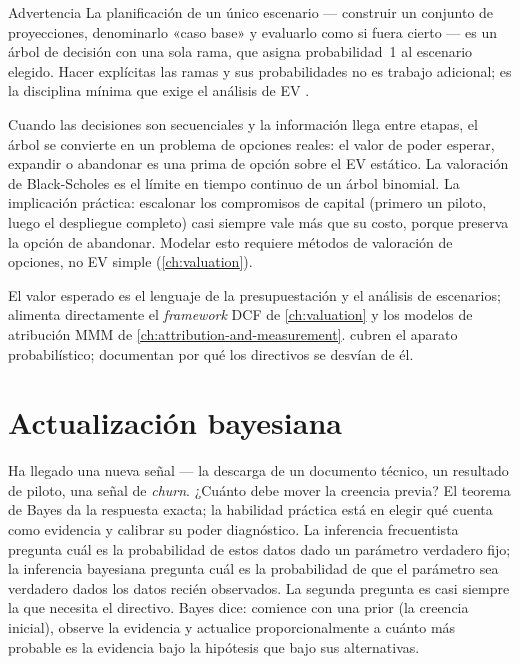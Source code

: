 \begin{admonition}{Advertencia}
La planificación de un único escenario --- construir un conjunto de proyecciones, denominarlo
«caso base» y evaluarlo como si fuera cierto --- es un árbol de decisión con una sola rama, que
asigna probabilidad~1 al escenario elegido. Hacer explícitas las ramas y sus probabilidades no es
trabajo adicional; es la disciplina mínima que exige el análisis de EV \parencite{kahneman2011}.
\end{admonition}

Cuando las decisiones son secuenciales y la información llega entre etapas, el árbol se convierte en
un problema de opciones reales: el valor de poder esperar, expandir o abandonar es una prima de opción
sobre el EV estático. La valoración de Black-Scholes es el límite en tiempo continuo de un árbol
binomial. La implicación práctica: escalonar los compromisos de capital (primero un piloto, luego el
despliegue completo) casi siempre vale más que su costo, porque preserva la opción de abandonar.
Modelar esto requiere métodos de valoración de opciones, no EV simple (\cref{ch:valuation}).

El valor esperado es el lenguaje de la presupuestación y el análisis de escenarios; alimenta directamente
el \emph{framework} DCF de \cref{ch:valuation} y los modelos de atribución MMM de
\cref{ch:attribution-and-measurement}. \textcite{anderson2019statistics} cubren el aparato probabilístico;
\textcite{kahneman2011} documentan por qué los directivos se desvían de él.

\section{Actualización bayesiana}\label{sec:bayesian-updating}

Ha llegado una nueva señal --- la descarga de un documento técnico, un resultado de piloto, una señal
de \emph{churn}. ¿Cuánto debe mover la creencia previa? El teorema de Bayes da la respuesta exacta;
la habilidad práctica está en elegir qué cuenta como evidencia y calibrar su poder diagnóstico.
La inferencia frecuentista pregunta cuál es la probabilidad de estos datos dado un parámetro verdadero
fijo; la inferencia bayesiana pregunta cuál es la probabilidad de que el parámetro sea verdadero dados
los datos recién observados. La segunda pregunta es casi siempre la que necesita el directivo. Bayes
dice: comience con una prior (la creencia inicial), observe la evidencia y actualice proporcionalmente
a cuánto más probable es la evidencia bajo la hipótesis que bajo sus alternativas.

